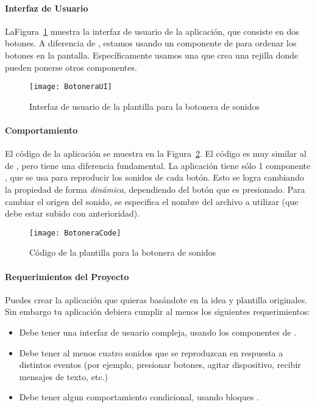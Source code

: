 \paragraph{Interfaz de Usuario}

LaFigura~\ref{fig:botoneraUI} muestra la interfaz de usuario de la aplicación, que consiste en dos botones. A diferencia de , estamos usando un componente de  para ordenar los botones en la pantalla. Específicamente usamos una  que crea una rejilla donde pueden ponerse otros componentes.

\begin{figure}[H]
  \centering
  \texttt{[image: BotoneraUI]}
  \caption{Interfaz de usuario de la plantilla para la botonera de sonidos}
  \label{fig:botoneraUI}
\end{figure}

\paragraph{Comportamiento}

El código de la aplicación se muestra en la Figura~\ref{fig:botoneraCode}. El código es muy similar al de , pero tiene una diferencia fundamental. La aplicación tiene sólo 1 componente , que se usa para reproducir los sonidos de cada botón. Esto se logra cambiando la propiedad  de forma \emph{dinámica}, dependiendo del botón que es presionado. Para cambiar el origen del sonido, se especifica el nombre del archivo a utilizar (que debe estar subido con anterioridad).

\begin{figure}[H]
  \centering
  \texttt{[image: BotoneraCode]}
  \caption{Código de la plantilla para la botonera de sonidos}
  \label{fig:botoneraCode}
\end{figure}

\paragraph{Requerimientos del Proyecto}

Puedes crear la aplicación que quieras basándote en la idea y plantilla originales. Sin embargo tu aplicación debiera cumplir al menos los siguientes requerimientos:

\begin{itemize}

\item Debe tener una interfaz de usuario compleja, usando los componentes de .

\item Debe tener al menos cuatro sonidos que se reproduzcan en respuesta a distintos eventos (por ejemplo, presionar botones, agitar dispositivo, recibir mensajes de texto, etc.)

\item Debe tener algun comportamiento condicional, usando bloques .

\end{itemize}

